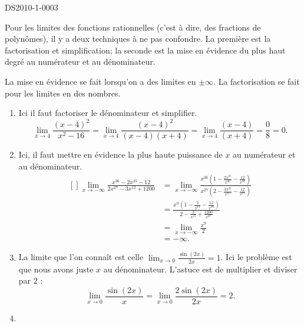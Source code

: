
\begin{corrige}{DS2010-1-0003}


	Pour les limites des fonctions rationnelles (c'est à dire, des fractions de polynômes), il y a deux techniques à ne pas confondre. La première est la factorisation et simplification; la seconde est la mise en évidence du plus haut degré au numérateur et au dénominateur.

	La mise en évidence se fait lorsqu'on a des limites en $\pm\infty$. La factorisation se fait pour les limites en des nombres.
	\begin{enumerate}
		\item
			Ici il faut factoriser le dénominateur et simplifier.
			\begin{equation}
				\lim_{x\to 4} \frac{ (x-4)^2 }{ x^2-16 }=\lim_{x\to 4} \frac{ (x-4)^2 }{ (x-4)(x+4) }=\lim_{x\to 4} \frac{ (x-4) }{ (x+4) }=\frac{ 0 }{ 8 }=0.
			\end{equation}
		\item
			Ici, il faut mettre en évidence la plus haute puissance de $x$ au numérateur et au dénominateur.
			\begin{equation}
				\begin{aligned}[]
					\lim_{x\to -\infty} \frac{ x^{36}-2x^{25}-12 }{ 2x^{27}-3x^{12}+1200 }&=\lim_{x\to -\infty} \frac{ x^{36}\left( 1-\frac{ 2x^{25} }{ x^{36} }-\frac{ 12 }{ x^{36} } \right) }{ x^{27}\left( 2-\frac{ 3x^{25} }{ x^{27} }-\frac{ 12 }{ x^{27} } \right) }\\
					&=\frac{ x^9\left( 1-\frac{ 2 }{ x^{11} }-\frac{ 12 }{ x^{36} } \right) }{ 2-\frac{ 3 }{ x^{15} }+\frac{ 1200 }{ x^{27} } }\\
					&=\lim_{x\to -\infty} \frac{ x^{9} }{ 2 }\\
					&=-\infty.
				\end{aligned}
			\end{equation}
		\item
			La limite que l'on connaît est celle $\lim_{x\to 0} \frac{ \sin(2x) }{ 2x }=1$. Ici le problème est que nous avons juste $x$ au dénominateur. L'astuce est de multiplier et diviser par $2$ :
			\begin{equation}
				\lim_{x\to 0} \frac{ \sin(2x) }{ x }=\lim_{x\to 0} \frac{ 2\sin(2x) }{ 2x }=2.
			\end{equation}
		\item

\end{enumerate}
\end{corrige}
